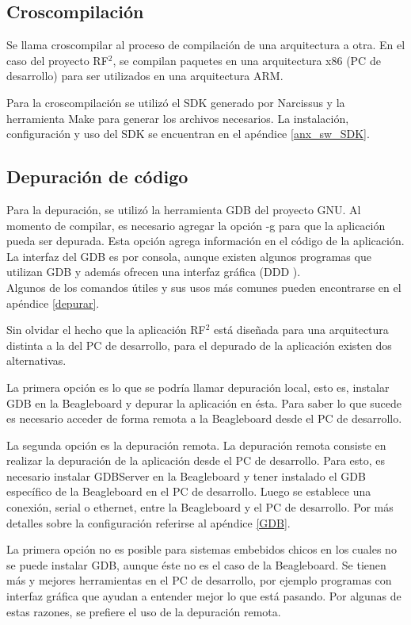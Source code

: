 \subsection{Croscompilación}
Se llama croscompilar al proceso de compilación de una arquitectura a otra. En el caso del proyecto RF$^{2}$, se compilan paquetes en una arquitectura x86 (PC de desarrollo) para ser utilizados en una arquitectura ARM.


Para la croscompilación se utilizó el SDK generado por Narcissus y la herramienta Make para generar los archivos necesarios. La instalación, configuración y uso del SDK se encuentran en el apéndice \ref{anx_sw_SDK}.

\subsection{Depuración de código}
Para la depuración, se utilizó la herramienta GDB del proyecto GNU. 
Al momento de compilar, es necesario agregar la opción -g para que la aplicación pueda ser depurada. Esta opción agrega información en el código de la aplicación.
La interfaz del GDB es por consola, aunque existen algunos programas que utilizan GDB y además ofrecen una interfaz gráfica (DDD \cite{DDD}). \\
Algunos de los comandos útiles y sus usos más comunes pueden encontrarse en el apéndice \ref{depurar}.


\bigskip
Sin olvidar el hecho que la aplicación RF$^{2}$ está diseñada para una arquitectura distinta a la del PC de desarrollo, para el depurado de la aplicación existen dos alternativas. 

La primera opción es lo que se podría llamar depuración local, esto es, instalar GDB en la Beagleboard y depurar la aplicación en ésta. Para saber lo que sucede es necesario acceder de forma remota a la Beagleboard desde el PC de desarrollo. 

La segunda opción es la depuración remota. La depuración remota consiste en realizar la depuración de la aplicación desde el PC de desarrollo. Para esto, es necesario instalar GDBServer en la Beagleboard y tener instalado el GDB específico de la Beagleboard en el PC de desarrollo. Luego se establece una conexión, serial o ethernet, entre la Beagleboard y el PC de desarrollo. Por más detalles sobre la configuración referirse al apéndice \ref{GDB}.

\bigskip
La primera opción no es posible para sistemas embebidos chicos en los cuales no se puede instalar GDB, aunque éste no es el caso de la Beagleboard. 
Se tienen más y mejores herramientas en el PC de desarrollo, por ejemplo programas con interfaz gráfica que ayudan a entender mejor lo que está pasando. Por algunas de estas razones, se prefiere el uso de la depuración remota. 

